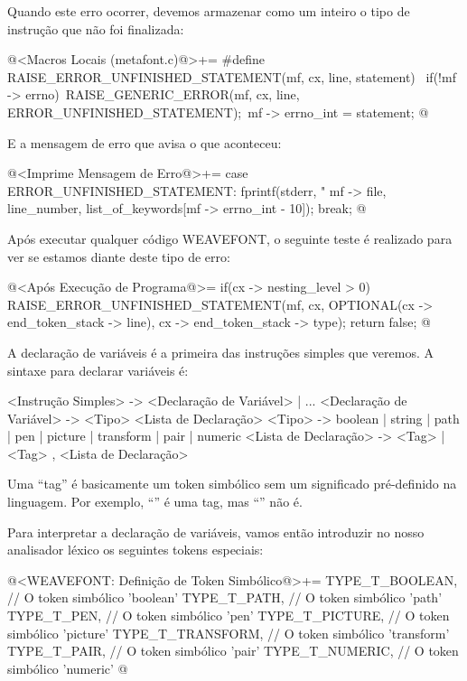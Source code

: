 Quando este erro ocorrer, devemos armazenar como um inteiro o tipo de
instrução que não foi finalizada:

\iniciocodigo
@<Macros Locais (metafont.c)@>+=
#define RAISE_ERROR_UNFINISHED_STATEMENT(mf, cx, line, statement) {\
  if(!mf -> errno){\
    RAISE_GENERIC_ERROR(mf, cx, line, ERROR_UNFINISHED_STATEMENT);\
    mf -> errno_int = statement;}}
@
\fimcodigo

E a mensagem de erro que avisa o que aconteceu:

\iniciocodigo
@<Imprime Mensagem de Erro@>+=
case ERROR_UNFINISHED_STATEMENT:
  fprintf(stderr, "%
          mf -> file, line_number, list_of_keywords[mf -> errno_int - 10]);
  break;
@
\fimcodigo

Após executar qualquer código WEAVEFONT, o seguinte teste é realizado
para ver se estamos diante deste tipo de erro:

\iniciocodigo
@<Após Execução de Programa@>=
if(cx -> nesting_level > 0){
  RAISE_ERROR_UNFINISHED_STATEMENT(mf, cx,
                                  OPTIONAL(cx -> end_token_stack -> line),
                                  cx -> end_token_stack -> type);
  return false;
}
@
\fimcodigo


A declaração de variáveis é a primeira das instruções simples que
veremos. A sintaxe para declarar variáveis é:

\alinhaverbatim
<Instrução Simples> -> <Declaração de Variável> | ...
<Declaração de Variável> -> <Tipo> <Lista de Declaração>
<Tipo> -> boolean | string | path | pen | picture | transform | pair |
          numeric
<Lista de Declaração> -> <Tag> | <Tag> , <Lista de Declaração>
\alinhanormal

Uma ``tag'' é basicamente um token simbólico sem um significado
pré-definido na linguagem. Por exemplo, ``'' é uma tag,
mas ``'' não é.

Para interpretar a declaração de variáveis, vamos então introduzir no
nosso analisador léxico os seguintes tokens especiais:

\iniciocodigo
@<WEAVEFONT: Definição de Token Simbólico@>+=
TYPE_T_BOOLEAN,               // O token simbólico 'boolean'
TYPE_T_PATH,                  // O token simbólico 'path'
TYPE_T_PEN,                   // O token simbólico 'pen'
TYPE_T_PICTURE,               // O token simbólico 'picture'
TYPE_T_TRANSFORM,             // O token simbólico 'transform'
TYPE_T_PAIR,                  // O token simbólico 'pair'
TYPE_T_NUMERIC,               // O token simbólico 'numeric'
@
\fimcodigo

